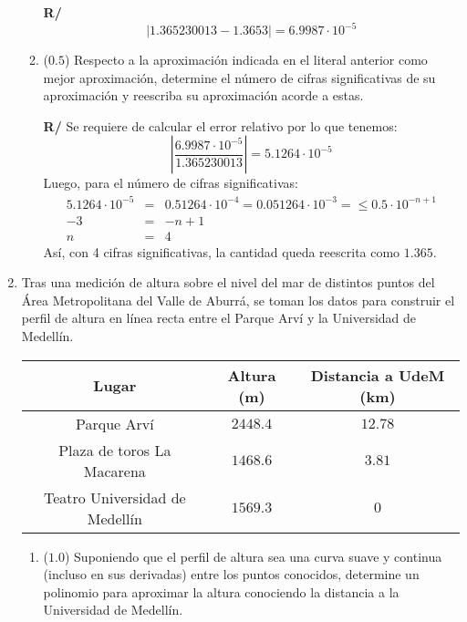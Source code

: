 \documentclass[12pt]{article}
\begin{document}
\begin{enumerate}[leftmargin=*,widest=9]
\begin{enumerate}[label=\alph*]
\textbf{R/} %
    \[\vert 1.365230013 -  1.3653 \vert = 6.9987\cdot 10^{-5} \]
    \item (\(0.5\)) Respecto a la aproximación indicada en el literal anterior como mejor aproximación, determine el número de cifras significativas de su aproximación y reescriba su aproximación acorde a estas.

\textbf{R/} Se requiere de calcular el error relativo por lo que tenemos:
    \[ \left \vert \frac{6.9987\cdot 10^{-5}}{1.365230013} \right\vert = 5.1264\cdot 10^{-5}\]
Luego, para el número de cifras significativas:
%
\begin{eqnarray*}
5.1264\cdot 10^{-5} &=& 0.51264\cdot 10^{-4} = 0.051264\cdot 10^{-3} = \leq 0.5 \cdot 10^{-n + 1}\\
-3 &=& - n + 1\\
n &=& 4
\end{eqnarray*}
Así, con 4 cifras significativas, la cantidad queda reescrita como \(1.365\).
    \end{enumerate}
    \item %
    Tras una medición de altura sobre el nivel del mar de distintos puntos del Área Metropolitana del Valle de Aburrá, se toman los datos para construir el perfil de altura en línea recta entre el Parque Arví y la Universidad de Medellín.
    \begin{center}
    \begin{tabular}{|c|c|c|}
    \hline
    Lugar & Altura (m) & Distancia a UdeM (km) \\
    \hline
    Parque Arví & \(2448.4\) & \(12.78\) \\
    Plaza de toros La Macarena & \(1468.6\) & \(3.81\) \\
    Teatro Universidad de Medellín & \(1569.3\) & \(0\) \\
    \hline
    \end{tabular}
    \end{center}
    \begin{enumerate}[label=\alph*]
    \item (\(1.0\)) Suponiendo que el perfil de altura sea una curva suave y continua (incluso en sus derivadas) entre los puntos conocidos, determine un polinomio para aproximar la altura conociendo la distancia a la Universidad de Medellín.


\end{enumerate}
\end{enumerate}
\end{document}
